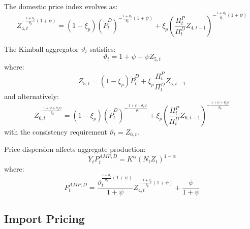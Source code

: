 \documentclass[12pt]{article}
\begin{document}
The domestic price index evolves as:
\begin{equation}
Z_{4,t}^{-\frac{1+\theta_p}{\theta_p}(1+\psi)} = (1-\xi_p) (\tilde{P}_t^D)^{-\frac{1+\theta_p}{\theta_p}(1+\psi)} + \xi_p \left( \frac{\Pi_t^P}{\Pi_t^D} Z_{4,t-1} \right)^{-\frac{1+\theta_p}{\theta_p}(1+\psi)}
\end{equation}

The Kimball aggregator $\vartheta_t$ satisfies:
\begin{equation}
\vartheta_t = 1 + \psi - \psi Z_{5,t}
\end{equation}
where:
\begin{equation}
Z_{5,t} = (1-\xi_p) \tilde{P}_t^D + \xi_p \frac{\Pi_t^P}{\Pi_t^D} Z_{5,t-1}
\end{equation}
and alternatively:
\begin{equation}
Z_{6,t}^{-\frac{1+\psi+\theta_p\psi}{\theta_p}} = (1-\xi_p) (\tilde{P}_t^D)^{-\frac{1+\psi+\theta_p\psi}{\theta_p}} + \xi_p \left( \frac{\Pi_t^P}{\Pi_t^D} Z_{6,t-1} \right)^{-\frac{1+\psi+\theta_p\psi}{\theta_p}}
\end{equation}
with the consistency requirement $\vartheta_t = Z_{6,t}$.

Price dispersion affects aggregate production:
\begin{equation}\label{eq:production}
Y_t P_t^{AMP,D} = K^\alpha (N_t Z_t)^{1-\alpha}
\end{equation}
where:
\begin{equation}
P_t^{AMP,D} = \frac{\vartheta_t^{\frac{1+\theta_p}{\theta_p}(1+\psi)}}{1+\psi} Z_{4,t}^{-\frac{1+\theta_p}{\theta_p}(1+\psi)} + \frac{\psi}{1+\psi}
\end{equation}

\subsection{Import Pricing}
\end{document}

